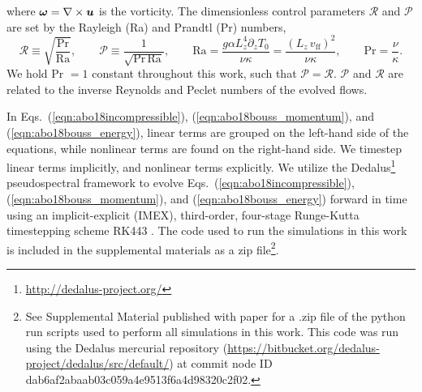 where $\bm{\omega} = \nabla \times \bm{u}$ is the vorticity.
The dimensionless control parameters $\mathcal{R}$ and $\mathcal{P}$ are set by the Rayleigh (Ra) and Prandtl (Pr) numbers,
\begin{equation}
\mathcal{R} \equiv \sqrt{\frac{\text{Pr}}{\text{Ra}}}, \qquad \mathcal{P} \equiv \frac{1}{\sqrt{\text{Pr}\,\text{Ra}}}, \qquad
\text{Ra} = \frac{g \alpha L_z^4 \partial_z T_0}{\nu\kappa} = \frac{(L_z\,v_{\text{ff}})^2}{\nu\kappa}, \qquad \text{Pr} = \frac{\nu}{\kappa}.
\end{equation}
We hold Pr $= 1$ constant throughout this work, such that $\mathcal{P} = \mathcal{R}$.
$\mathcal{P}$ and $\mathcal{R}$ are related to the inverse Reynolds and Peclet numbers of the evolved flows.

In Eqs.~(\ref{eqn:abo18incompressible}), (\ref{eqn:abo18bouss_momentum}), and (\ref{eqn:abo18bouss_energy}), linear terms are grouped on the left-hand side of the equations, while nonlinear terms are found on the right-hand side. We timestep linear terms implicitly, and nonlinear terms explicitly.
We utilize the Dedalus\footnote{\url{http://dedalus-project.org/}} pseudospectral framework \cite{burns&all2016} to evolve Eqs.~(\ref{eqn:abo18incompressible}), (\ref{eqn:abo18bouss_momentum}), and (\ref{eqn:abo18bouss_energy}) forward in time using an implicit-explicit (IMEX), third-order, four-stage Runge-Kutta timestepping scheme RK443 \cite{ascher&all1997}. 
The code used to run the simulations in this work is included in the supplemental materials as a zip file\footnote{See Supplemental Material published with paper for a .zip file of the python run scripts used to perform all simulations in this work. This code was run using the Dedalus mercurial repository (\url{https://bitbucket.org/dedalus-project/dedalus/src/default/}) at commit node ID dab6af2abaab03c059a4e9513f6a4d98320c2f02.}.

